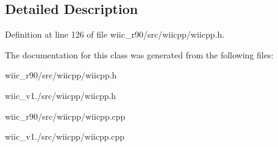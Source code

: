 \subsection{Detailed Description}


Definition at line 126 of file wiic\-\_\-r90/src/wiicpp/wiicpp.\-h.



The documentation for this class was generated from the following files\-:\begin{DoxyCompactItemize}
\item 
wiic\-\_\-r90/src/wiicpp/wiicpp.\-h\item 
wiic\-\_\-v1./src/wiicpp/wiicpp.\-h\item 
wiic\-\_\-r90/src/wiicpp/wiicpp.\-cpp\item 
wiic\-\_\-v1./src/wiicpp/wiicpp.\-cpp\end{DoxyCompactItemize}
